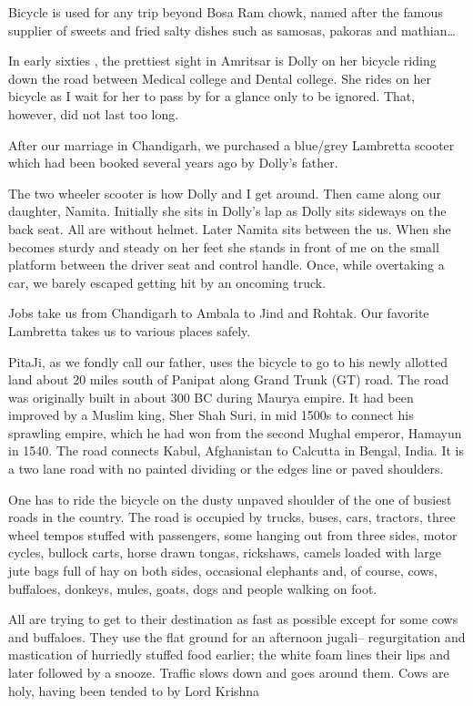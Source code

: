 Bicycle is used for any trip beyond Bosa Ram chowk, named after the famous
supplier of sweets and fried salty dishes such as samosas, pakoras and
mathian…

In early sixties , the prettiest sight in Amritsar is Dolly on her bicycle
riding down the road between Medical college and Dental college. She rides
on her bicycle as I wait for her to pass by for a glance only to be
ignored. That, however, did not last too long.

After our marriage in Chandigarh, we purchased a blue/grey Lambretta
scooter which had been booked several years ago by Dolly's father.

The two wheeler scooter is how Dolly and I get around. Then came along our
daughter, Namita. Initially she sits in Dolly's lap as Dolly sits sideways
on the back seat. All are without helmet. Later Namita sits between the
us. When she becomes sturdy and steady on her feet she stands in front of
me on the small platform between the driver seat and control handle. Once,
while overtaking a car, we barely escaped getting hit by an oncoming
truck.

Jobs take us from Chandigarh to Ambala to Jind and Rohtak. Our favorite
Lambretta takes us to various places safely.

PitaJi, as we fondly call our father, uses the bicycle to go to his newly
allotted land about 20 miles south of Panipat along Grand Trunk (GT) road.
The road was originally built in about 300 BC during Maurya empire. It had
been improved by a Muslim king, Sher Shah Suri, in mid 1500s to connect
his sprawling empire, which he had won from the second Mughal emperor,
Hamayun in 1540. The road connects Kabul, Afghanistan to Calcutta in
Bengal, India. It is a two lane road with no painted dividing or the edges
line or paved shoulders.

One has to ride the bicycle on the dusty unpaved shoulder of the one of
busiest roads in the country. The road is occupied by trucks, buses, cars,
tractors, three wheel tempos stuffed with passengers, some hanging out
from three sides, motor cycles, bullock carts, horse drawn tongas,
rickshaws, camels loaded with large jute bags full of hay on both sides,
occasional elephants and, of course, cows, buffaloes, donkeys, mules,
goats, dogs and people walking on foot.

All are trying to get to their destination as fast as possible except for
some cows and buffaloes. They use the flat ground for an afternoon
jugali-- regurgitation and mastication of hurriedly stuffed food earlier;
the white foam lines their lips and later followed by a snooze. Traffic
slows down and goes around them. Cows are holy, having been tended to by
Lord Krishna

